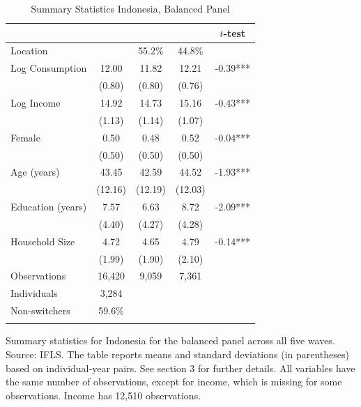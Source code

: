 \begin{table}[htbp] \centering \caption{Summary Statistics Indonesia, Balanced Panel}\label{tab:summary_stats_IDN_bal} \begin{threeparttable} \begin{tabular}{l cccc} \toprule
 &  &  &  & $t$-test \\
\midrule
Location &  &   55.2\% &   44.8\% &  \\  \addlinespace \addlinespace
Log Consumption & 12.00 & 11.82 & 12.21 & -0.39*** \\
 & (0.80) & (0.80) & (0.76) &  \\  \addlinespace
Log Income & 14.92 & 14.73 & 15.16 & -0.43*** \\
 & (1.13) & (1.14) & (1.07) &  \\  \addlinespace
Female & 0.50 & 0.48 & 0.52 & -0.04*** \\
 & (0.50) & (0.50) & (0.50) &  \\  \addlinespace
Age (years) & 43.45 & 42.59 & 44.52 & -1.93*** \\
 & (12.16) & (12.19) & (12.03) &  \\  \addlinespace
Education (years) & 7.57 & 6.63 & 8.72 & -2.09*** \\
 & (4.40) & (4.27) & (4.28) &  \\  \addlinespace
Household Size & 4.72 & 4.65 & 4.79 & -0.14*** \\
 & (1.99) & (1.90) & (2.10) &  \\  \addlinespace


\cmidrule{2-5}
Observations & 16,420 & 9,059 & 7,361 &  \\  \addlinespace
Individuals & 3,284 &  &  &  \\
Non-switchers &   59.6\% &  &  &  \\  \addlinespace
\bottomrule \end{tabular} \begin{tablenotes}[flushleft] \footnotesize \item{Summary statistics for Indonesia for the balanced panel across all five waves. Source: IFLS. The table reports means and standard deviations (in parentheses) based on individual-year pairs. See section 3 for further details. All variables have the same number of observations, except for income, which is missing for some observations. Income has 12,510 observations.} \end{tablenotes} \end{threeparttable} \end{table}